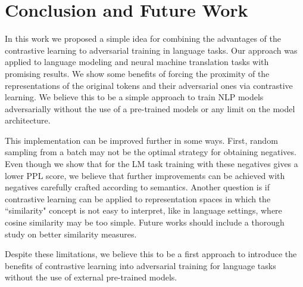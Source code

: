 \documentclass[letterpaper]{article} %
\begin{document}
\section{Conclusion and Future Work}
In this work we proposed a simple idea for combining the advantages of the contrastive learning to adversarial training in language tasks. Our approach was applied to language modeling and neural machine translation tasks with promising results. We show some benefits of forcing the proximity of the representations of the original tokens and their adversarial ones via contrastive learning. We believe this to be a simple approach to train NLP models adversarially without the use of a pre-trained models or any limit on the model architecture.

This implementation can be improved further in some ways. First, random sampling from a batch may not be the optimal strategy for obtaining negatives. Even though we show that for the LM task training with these negatives gives a lower PPL score, we believe that further improvements can be achieved with negatives carefully crafted according to semantics. Another question is if contrastive learning can be applied to representation spaces in which the ``similarity" concept is not easy to interpret, like in language settings, where cosine similarity may be too simple. Future works should include a thorough study on better similarity measures.

Despite these limitations, we believe this to be a first approach to introduce the benefits of contrastive learning into adversarial training for language tasks without the use of external pre-trained models. 







\end{document}
